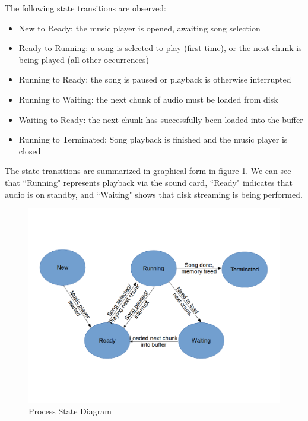 \documentclass{amsart}
\begin{document}
	The following state transitions are observed:
	\begin{itemize}
		\item New to Ready: the music player is opened, awaiting song selection
		\item Ready to Running: a song is selected to play (first time), or the next chunk is being played (all other occurrences)
		\item Running to Ready: the song is paused or playback is otherwise interrupted
		\item Running to Waiting: the next chunk of audio must be loaded from disk
		\item Waiting to Ready: the next chunk has successfully been loaded into the buffer
		\item Running to Terminated: Song playback is finished and the music player is closed
	\end{itemize}

	The state transitions are summarized in graphical form in figure \ref{statediagram}. We can see that ``Running" represents playback via the sound card, ``Ready" indicates that audio is on standby, and ``Waiting" shows that disk streaming is being performed.

	
	\begin{figure}\caption{Process State Diagram}\label{statediagram}
		\includegraphics[scale=0.5]{diagram.png}
	\end{figure}
	
	
	
	
	
	
	
	
	
\end{document}
